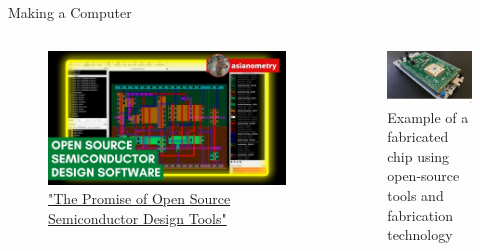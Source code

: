 \documentclass[aspectratio=169]{beamer}
\begin{document}
\begin{frame}{Making a Computer}

    \begin{columns}
        \begin{column}{0.5\textwidth}
            \begin{figure}
                \centering
                \includegraphics[width=\textwidth]{imgs/oseda.jpg}
                \\
                \href{https://www.youtube.com/watch?v=OmEbzRp_NGg}{"The Promise of Open Source Semiconductor Design Tools"}
            \end{figure}
        \end{column}
        \begin{column}{0.5\textwidth}
            \begin{figure}
                \centering
                \includegraphics[width=\textwidth]{imgs/tapeout_chip.jpg}
                \\
                Example of a fabricated chip using open-source tools and fabrication technology
            \end{figure}
        \end{column}
    \end{columns}

\end{frame}
\end{document}
